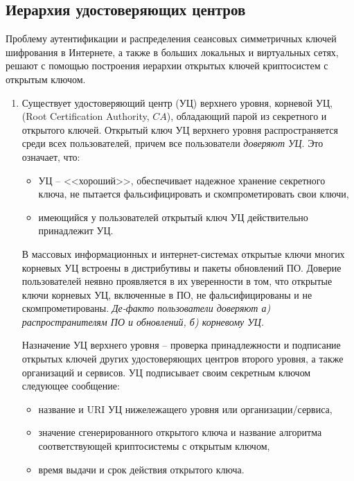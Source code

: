 \subsection{Иерархия удостоверяющих центров}

Проблему аутентификации и распределения сеансовых симметричных ключей шифрования в Интернете, а также в больших локальных и виртуальных сетях, решают с помощью построения иерархии открытых ключей криптосистем с открытым ключом.

\begin{enumerate}
    \item Существует удостоверяющий центр (УЦ) верхнего уровня, корневой УЦ, (Root Certification Authority, $CA$), обладающий парой из секретного и открытого ключей. Открытый ключ УЦ верхнего уровня распространяется среди всех пользователей, причем все пользователи \emph{доверяют УЦ}. Это означает, что:
        \begin{itemize}
            \item УЦ -- <<хороший>>, обеспечивает надежное хранение секретного ключа, не пытается фальсифицировать и скомпрометировать свои ключи,
            \item имеющийся у пользователей открытый ключ УЦ действительно принадлежит УЦ.
        \end{itemize}
        В массовых информационных и интернет-системах открытые ключи многих корневых УЦ встроены в дистрибутивы и пакеты обновлений ПО. Доверие пользователей неявно проявляется в их уверенности в том, что открытые ключи корневых УЦ, включенные в ПО, не фальсифицированы и не скомпрометированы. \emph{Де-факто пользователи доверяют а) распространителям ПО и обновлений, б) корневому УЦ.}

        Назначение УЦ верхнего уровня -- проверка принадлежности и подписание открытых ключей других удостоверяющих центров второго уровня, а также организаций и сервисов. УЦ подписывает своим секретным ключом следующее сообщение:
        \begin{itemize}
            \item название и URI УЦ нижележащего уровня или организации/сервиса,
            \item значение сгенерированного открытого ключа и название алгоритма соответствующей криптосистемы с открытым ключом,
            \item время выдачи и срок действия открытого ключа.
        \end{itemize}


\end{enumerate}
